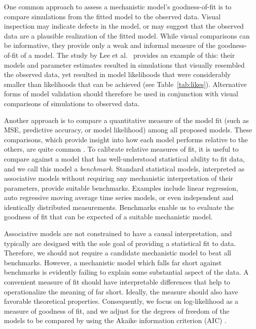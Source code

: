 \documentclass[10pt,letterpaper]{article}\usepackage[]{graphicx}\usepackage[table]{xcolor}
\begin{document}
One common approach to assess a mechanistic model's goodness-of-fit is to compare simulations from the fitted model to the observed data.
Visual inspection may indicate defects in the model, or may  suggest that the observed data are a plausible realization of the fitted model.
While visual comparisons can be informative, they provide only a weak and informal measure of the goodness-of-fit of a model.
The study by Lee et al.~\cite{lee20} provides an example of this: their models and parameter estimates resulted in simulations that visually resembled the observed data, yet resulted in model likelihoods that were considerably smaller than likelihoods that can be achieved  (see Table~\ref{tab:likes}).
Alternative forms of model validation should therefore be used in conjunction with visual comparisons of simulations to observed data.

Another approach is to compare a quantitative measure of the model fit (such as MSE, predictive accuracy, or model likelihood) among all proposed models.
These comparisons, which provide insight into how each model performs relative to the others, are quite common \cite{rinaldo12,sallah17}.
To calibrate relative measures of fit, it is useful to compare against a model that has well-understood statistical ability to fit data, and we call this model a {\it benchmark}.
Standard statistical models, interpreted as associative models without requiring any mechanistic interpretation of their parameters, provide suitable benchmarks.
Examples include linear regression, auto regressive moving average  time series models, or even independent and identically distributed measurements.
Benchmarks enable us to evaluate the goodness of fit that can be expected of a suitable mechanistic model.

Associative models are not constrained to have a causal interpretation, and typically are designed with the sole goal of providing a statistical fit to data.
Therefore, we should not require a candidate mechanistic model to beat all benchmarks.
However, a mechanistic model which falls far short against benchmarks is evidently failing to explain some substantial aspect of the data.
A convenient measure of fit should have interpretable differences that help to operationalize the meaning of far short.
Ideally, the measure should also have favorable theoretical properties.
Consequently, we focus on log-likelihood as a measure of goodness of fit, and we adjust for the degrees of freedom of the models to be compared by using the Akaike information criterion (AIC) \cite{aic74}.
\end{document}

